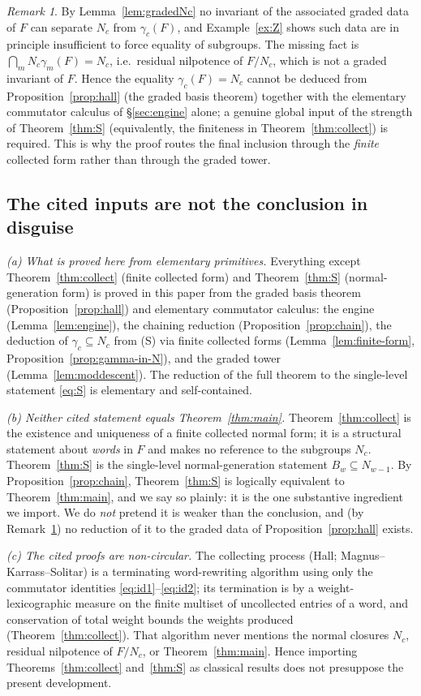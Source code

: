 \documentclass{amsart}
\theoremstyle{definition}
\theoremstyle{remark}
\newtheorem{remark}{Remark}
\begin{document}
\begin{remark}\label{rem:graded-insufficient}
By Lemma~\ref{lem:gradedNc} no invariant of the associated graded data of $F$ can
separate $N_c$ from $\gamma_c(F)$, and Example~\ref{ex:Z} shows such data are in
principle insufficient to force equality of subgroups. The missing fact is
$\bigcap_m N_c\gamma_m(F)=N_c$, i.e.\ residual nilpotence of $F/N_c$, which is not a
graded invariant of $F$. Hence the equality $\gamma_c(F)=N_c$ cannot be deduced from
Proposition~\ref{prop:hall} (the graded basis theorem) together with the elementary
commutator calculus of \S\ref{sec:engine} alone; a genuine global input of the
strength of Theorem~\ref{thm:S} (equivalently, the finiteness in
Theorem~\ref{thm:collect}) is required. This is why the proof routes the final
inclusion through the \emph{finite} collected form rather than through the graded
tower.
\end{remark}

\subsection{The cited inputs are not the conclusion in disguise}

\emph{(a) What is proved here from elementary primitives.} Everything except
Theorem~\ref{thm:collect} (finite collected form) and Theorem~\ref{thm:S}
(normal-generation form) is proved in this paper from the graded basis theorem
(Proposition~\ref{prop:hall}) and elementary commutator calculus: the engine
(Lemma~\ref{lem:engine}), the chaining reduction
(Proposition~\ref{prop:chain}), the deduction of $\gamma_c\subseteq N_c$ from (S)
via finite collected forms (Lemma~\ref{lem:finite-form},
Proposition~\ref{prop:gamma-in-N}), and the graded tower
(Lemma~\ref{lem:moddescent}). The reduction of the full theorem to the single-level
statement \eqref{eq:S} is elementary and self-contained.

\emph{(b) Neither cited statement equals Theorem~\ref{thm:main}.}
Theorem~\ref{thm:collect} is the existence and uniqueness of a finite collected
normal form; it is a structural statement about \emph{words} in $F$ and makes no
reference to the subgroups $N_c$. Theorem~\ref{thm:S} is the single-level
normal-generation statement $B_w\subseteq N_{w-1}$. By
Proposition~\ref{prop:chain}, Theorem~\ref{thm:S} is logically equivalent to
Theorem~\ref{thm:main}, and we say so plainly: it is the one substantive ingredient
we import. We do \emph{not} pretend it is weaker than the conclusion, and (by
Remark~\ref{rem:graded-insufficient}) no reduction of it to the graded data of
Proposition~\ref{prop:hall} exists.

\emph{(c) The cited proofs are non-circular.} The collecting process (Hall;
Magnus--Karrass--Solitar) is a terminating word-rewriting algorithm using only the
commutator identities \eqref{eq:id1}--\eqref{eq:id2}; its termination is by a
weight-lexicographic measure on the finite multiset of uncollected entries of a
word, and conservation of total weight bounds the weights produced
(Theorem~\ref{thm:collect}). That algorithm never mentions the normal closures
$N_c$, residual nilpotence of $F/N_c$, or Theorem~\ref{thm:main}. Hence importing
Theorems~\ref{thm:collect} and~\ref{thm:S} as classical results does not presuppose
the present development.
\end{document}
